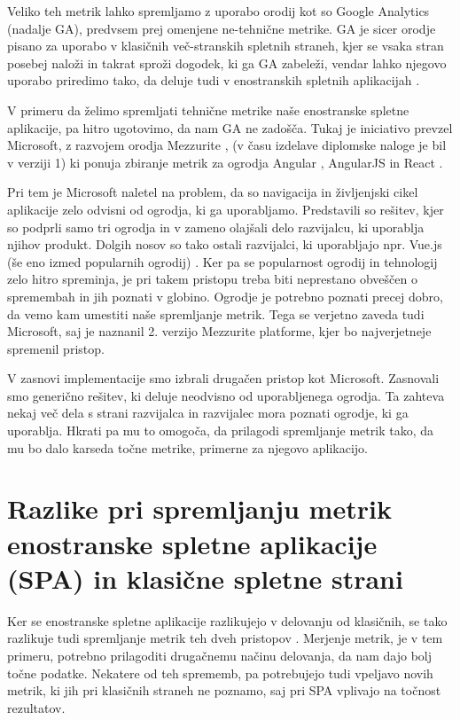 \documentclass[a4paper, 12pt]{book}
\begin{document}
Veliko teh metrik lahko spremljamo z uporabo orodij kot so Google Analytics \cite{ga_website} (nadalje GA), predvsem prej omenjene ne-tehnične metrike. GA je sicer orodje pisano za uporabo v klasičnih več-stranskih spletnih straneh, kjer se vsaka stran posebej naloži in takrat sproži dogodek, ki ga GA zabeleži, vendar lahko njegovo uporabo priredimo tako, da deluje tudi v enostranskih spletnih aplikacijah \cite{ga_spa}.

V primeru da želimo spremljati tehnične metrike naše enostranske spletne aplikacije, pa hitro ugotovimo, da nam GA ne zadošča. Tukaj je iniciativo prevzel Microsoft, z razvojem orodja Mezzurite \cite{mezzurite_website}, (v času izdelave diplomske naloge je bil v verziji 1) ki ponuja zbiranje metrik za ogrodja Angular \cite{angular_website}, AngularJS \cite{angularjs_website} in React \cite{react_website}.

Pri tem je Microsoft naletel na problem, da so navigacija in življenjski cikel aplikacije zelo odvisni od ogrodja, ki ga uporabljamo. Predstavili so rešitev, kjer so podprli samo tri ogrodja in v zameno olajšali delo razvijalcu, ki uporablja njihov produkt. Dolgih nosov so tako ostali razvijalci, ki uporabljajo npr. Vue.js (še eno izmed popularnih ogrodij) \cite{vue_website}. Ker pa se popularnost ogrodij in tehnologij zelo hitro spreminja, je pri takem pristopu treba biti neprestano obveščen o spremembah in jih poznati v globino. Ogrodje je potrebno poznati  precej dobro, da vemo kam umestiti naše spremljanje metrik. Tega se verjetno zaveda tudi Microsoft, saj je naznanil 2. verzijo Mezzurite platforme, kjer bo najverjetneje spremenil pristop.

V zasnovi implementacije smo izbrali drugačen pristop kot Microsoft. Zasnovali smo generično rešitev, ki deluje neodvisno od uporabljenega ogrodja. Ta zahteva nekaj več dela s strani razvijalca in razvijalec mora poznati ogrodje, ki ga uporablja. Hkrati pa mu to omogoča, da prilagodi spremljanje metrik tako, da mu bo dalo karseda točne metrike, primerne za njegovo aplikacijo.

\chapter{Razlike pri spremljanju metrik enostranske spletne aplikacije (SPA) in klasične spletne strani}
\label{ch1}

Ker se enostranske spletne aplikacije razlikujejo v delovanju od klasičnih, se tako razlikuje tudi spremljanje metrik teh dveh pristopov \cite{spa_vs_multi} \cite{spa_blakit}. Merjenje metrik, je v tem primeru, potrebno prilagoditi drugačnemu načinu delovanja, da nam dajo bolj točne podatke. Nekatere od teh sprememb, pa potrebujejo tudi vpeljavo novih metrik, ki jih pri klasičnih straneh ne poznamo, saj pri SPA vplivajo na točnost rezultatov.
\end{document}
